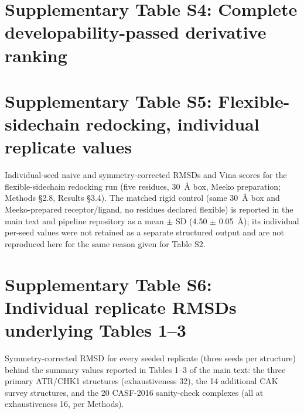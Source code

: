 \documentclass[11pt]{article}
\begin{document}
\section*{Supplementary Table S4: Complete developability-passed
derivative ranking}



\section*{Supplementary Table S5: Flexible-sidechain redocking, individual
replicate values}

Individual-seed naive and symmetry-corrected RMSDs and Vina scores for
the flexible-sidechain redocking run (five residues, 30~\AA{} box, Meeko
preparation; Methods \S2.8, Results \S3.4). The matched rigid control
(same 30~\AA{} box and Meeko-prepared receptor/ligand, no residues
declared flexible) is reported in the main text and pipeline repository
as a mean $\pm$ SD (4.50 $\pm$ 0.05~\AA{}); its individual per-seed values
were not retained as a separate structured output and are not
reproduced here for the same reason given for Table S2.

\begin{center}

\end{center}

\section*{Supplementary Table S6: Individual replicate RMSDs underlying
Tables 1--3}

Symmetry-corrected RMSD for every seeded replicate (three seeds per
structure) behind the summary values reported in Tables 1--3 of the main
text: the three primary ATR/CHK1 structures (exhaustiveness 32), the 14
additional CAK survey structures, and the 20 CASF-2016 sanity-check
complexes (all at exhaustiveness 16, per Methods).

{\footnotesize

}



\end{document}
